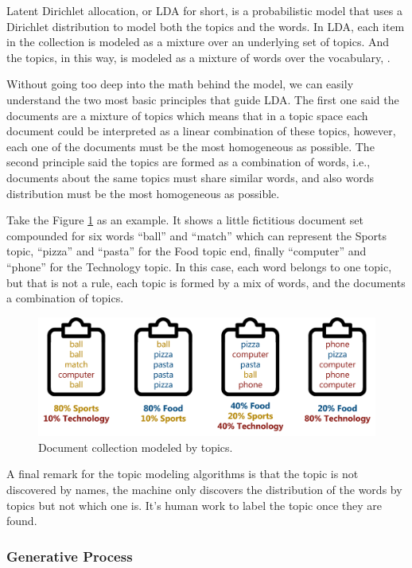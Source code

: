 	Latent Dirichlet allocation, or LDA for short, is a probabilistic model that uses a Dirichlet distribution to model both the topics and the words. In LDA, each item in the collection is modeled as a mixture over an underlying set of topics. And the topics, in this way, is modeled as a mixture of words over the vocabulary, \cite{blei2003latent}.
		
	Without going too deep into the math behind the model, we can easily understand the two most basic principles that guide LDA. The first one said the documents are a mixture of topics which means that in a topic space each document could be interpreted as a linear combination of these topics, however, each one of the documents must be the most homogeneous as possible. The second principle said the topics are formed as a combination of words, i.e., documents about the same topics must share similar words, and also words distribution must be the most homogeneous as possible.
	
	Take the Figure \ref{fig:topicmodeling} as an example. It shows a little fictitious document set compounded for six words ``ball'' and ``match'' which can represent the Sports topic, ``pizza'' and ``pasta'' for the Food topic end, finally ``computer'' and ``phone'' for the Technology  topic. In this case, each word belongs to one topic, but that is not a rule, each topic is formed by a mix of words, and the documents a combination of topics.
	
	\begin{figure}[h!]
		\centering
		\includegraphics[width=\linewidth]{01.Chapters/02.Background/topic_modeling}
		\caption{Document collection modeled by topics.}
		\label{fig:topicmodeling}
	\end{figure}
		
	A final remark for the topic modeling algorithms is that the topic is not discovered by names, the machine only discovers the distribution of the words by topics but not which one is. It's human work to label the topic once they are found.
	
	\subsubsection{Generative Process}
	
